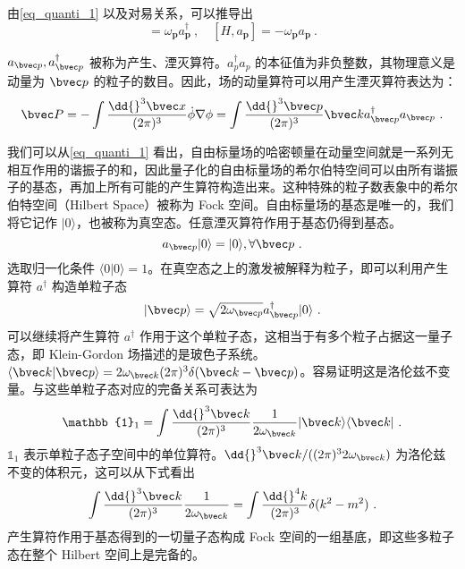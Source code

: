 由\autoref{eq_quanti_1} 以及对易关系，可以推导出
\begin{equation}
[H,a_{\mathbf p}^\dagger] = \omega_{\mathbf p} a^\dagger_{\mathbf p}~, \quad [H,a_{\mathbf p}] = -\omega_{\mathbf p} a_{\mathbf p}~.
\end{equation}

$a_{\bvec p},a_{\bvec p}^\dagger$ 被称为产生、湮灭算符。$a_p^\dagger a_p$ 的本征值为非负整数，其物理意义是动量为 $\bvec p$ 的粒子的数目。因此，场的动量算符可以用产生湮灭算符表达为：
\begin{equation}
\bvec P=-\int \frac{\dd{}^3 \bvec x}{(2\pi)^3}\dot\phi\nabla\phi=\int \frac{\dd{}^3 \bvec p}{(2\pi)^3 }\bvec k a_{\bvec p}^\dagger a_{\bvec p}~.
\end{equation} 

我们可以从\autoref{eq_quanti_1} 看出，自由标量场的哈密顿量在动量空间就是一系列无相互作用的谐振子的和，因此量子化的自由标量场的希尔伯特空间可以由所有谐振子的基态，再加上所有可能的产生算符构造出来。这种特殊的粒子数表象中的希尔伯特空间（Hilbert Space）被称为 Fock 空间。自由标量场的基态是唯一的，我们将它记作 $|0\rangle$，也被称为真空态。任意湮灭算符作用于基态仍得到基态。
\begin{equation}
a_{\bvec p} |0\rangle = |0\rangle,\forall \bvec p~.
\end{equation}
选取归一化条件 $\langle 0|0\rangle=1$。在真空态之上的激发被解释为粒子，即可以利用产生算符 $a^\dagger$ 构造单粒子态
\begin{equation}
|\bvec p\rangle = \sqrt{2\omega_{\bvec p}}a^\dagger_{\bvec p} |0\rangle~.
\end{equation}
可以继续将产生算符 $a^\dagger$ 作用于这个单粒子态，这相当于有多个粒子占据这一量子态，即 Klein-Gordon 场描述的是玻色子系统。$\langle \bvec k|\bvec p\rangle = 2\omega_{\bvec k}(2\pi)^3\delta(\bvec k-\bvec p)$。容易证明这是洛伦兹不变量。与这些单粒子态对应的完备关系可表达为
\begin{equation}
\mathbb{1}_1 = \int \frac{\dd{}^3 \bvec k}{(2\pi)^{3}}\frac{1}{2\omega_{\bvec k}}|\bvec k\rangle \langle \bvec k|~.
\end{equation}
$\mathbb{1}_1$ 表示单粒子态子空间中的单位算符。$\dd{}^3 \bvec k/((2\pi)^3 2\omega_{\bvec k})$ 为洛伦兹不变的体积元，这可以从下式看出
\begin{equation}
\int \frac{\dd{}^3\bvec k}{(2\pi)^3}\frac{1}{2\omega_{\bvec k}}=\int \frac{\dd{}^4 k}{(2\pi)^3} \delta(k^2-m^2)~.
\end{equation}
产生算符作用于基态得到的一切量子态构成 Fock 空间的一组基底，即这些多粒子态在整个 Hilbert 空间上是完备的。

